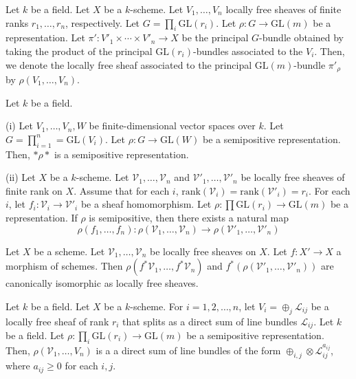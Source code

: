 \begin{definition}
Let $k$ be a field.
Let $X$ be a $k$-scheme. 
Let $V_1,\ldots,V_n$ locally free sheaves of finite ranks $r_1,\dots, r_n$, respectively.
Let $G=\prod_i \mathrm{GL}(r_i)$.
Let $\rho:G\rightarrow \mathrm{GL}(m)$ be a representation. 
Let $\pi':V'_1\times\cdots\times V'_n\to X$ be the principal $G$-bundle obtained by taking the product of the principal $\mathrm{GL}(r_i)$-bundles associated to the $V_i$.
Then, we denote the locally free sheaf associated to the principal $\mathrm{GL}(m)$-bundle $\pi'_{\rho}$ by $\rho(V_1,\dots, V_n)$.
\end{definition}





\begin{lemma}
Let $k$ be a field.
\item[(i)]
Let $V_1,\ldots,V_n,W$ be finite-dimensional vector spaces over $k$.
Let $G=\prod_{i=1}^{n}=\mathrm{GL}(V_i)$.
Let $\rho:G\rightarrow \mathrm{GL}(W)$ be a semipositive representation. Then, $*\rho*$ is a semipositive representation.
\item[(ii)] Let $X$ be a $k$-scheme.
Let $\mathcal{V}_1,\dots, \mathcal{V}_n$ and $\mathcal{V}'_1,\dots,\mathcal{V}'_n$ be locally free sheaves of finite rank on $X$.
Assume that for each $i$, $\mathrm{rank}(\mathcal{V}_i)=\mathrm{rank}(\mathcal{V}'_i)=r_i$.
For each $i$, let $f_i:\mathcal{V}_i\rightarrow \mathcal{V}'_i$ be a sheaf homomorphism.
Let $\rho:\prod\mathrm{GL}(r_i)\to\mathrm{GL}(m)$ be a representation.
If $\rho$ is semipositive, then there exists a natural map
$$
\rho(f_1,\dots, f_n):\rho(\mathcal{V}_1,\ldots,\mathcal{V}_n)\rightarrow \rho(\mathcal{V}'_1,\dots,\mathcal{V}'_n)
$$
\end{lemma}



\begin{lemma}\label{pullback_and_rho_commute}
Let $X$ be a scheme.
Let $\mathcal{V}_1,\ldots,\mathcal{V}_n$ be locally free sheaves on $X$. Let $f:X'\rightarrow X$ a morphism of schemes.
Then $\rho(f^*\mathcal{V}_1,\dots,f^*\mathcal{V}_n)$ and $f^*(\rho(\mathcal{V}'_1,\dots,\mathcal{V}'_n))$ are canonically isomorphic as locally free sheaves.
\end{lemma}


\begin{lemma}
Let $k$ be a field.
Let $X$ be a $k$-scheme.
For $i=1,2,\ldots,n$, let $V_i=\oplus_{j}\mathcal{L}_{ij}$ be a locally free sheaf of rank $r_i$ that splits as a direct sum of line bundles $\mathcal{L}_{ij}$.
Let $k$ be a field.
Let $\rho:\prod_{i}\mathrm{GL}(r_i)\to \mathrm{GL}(m)$ be a semipositive representation. 
Then, $\rho(\mathcal{V}_1,\ldots,V_n)$ is a a direct sum of line bundles of the form $\oplus_{i,j}\otimes\mathcal{L}_{ij}^{a_{ij}}$, where $a_{ij}\ge0$ for each $i,j$.
\end{lemma}

